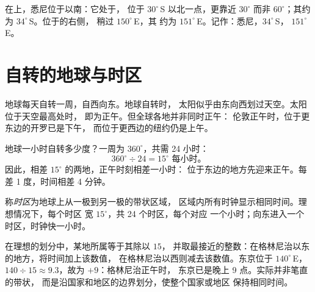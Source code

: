 \begin{example}[读取悉尼的坐标]\label{ex:g6:latitude-longitude:sydney}
在上，悉尼位于以南：它处于，
位于 $30^\circ$\,S 以北一点，更靠近 $30^\circ$
而非 $60^\circ$；其约为 $34^\circ$\,S。位于的右侧，
稍过 $150^\circ$\,E，其
约为 $151^\circ$\,E。记作：悉尼，$34^\circ$\,S，
$151^\circ$\,E。
\end{example}

\section{自转的地球与时区}

地球每天自转一周，自西向东。地球自转时，
太阳似乎由东向西划过天空。太阳位于天空最高处时，
即为正午。但全球各地并非同时正午：
伦敦正午时，位于更东边的开罗已是下午，
而位于更西边的纽约仍是上午。

地球一小时自转多少度？一周为 $360^\circ$，共需
24 小时：
\[
360^\circ \div 24 = 15^\circ \text{ 每小时。}
\]
因此，相差 $15^\circ$ 的两地，正午时刻相差一小时：
位于东边的地方先迎来正午。每差 1 度，时间相差 4 分钟。

\begin{definition}[时区]\label{def:g6:latitude-longitude:time-zone}
称\emph{时区}为地球上从一极到另一极的带状区域，
区域内所有时钟显示相同时间。理想情况下，每个时区
宽 $15^\circ$，共 24 个时区，每个对应
一个小时；向东进入一个时区，时钟快一小时。
\end{definition}

在理想的划分中，某地所属等于其除以 $15$，
并取最接近的整数：在格林尼治以东的地方，将时间加上该数值，
在格林尼治以西则减去该数值。东京位于
$140^\circ$\,E，$140 \div 15 \approx 9.3$，故为 $+9$：格林尼治正午时，
东京已是晚上 9 点。实际并非笔直的带状，
而是沿国家和地区的边界划分，使整个国家或地区
保持相同时间。

